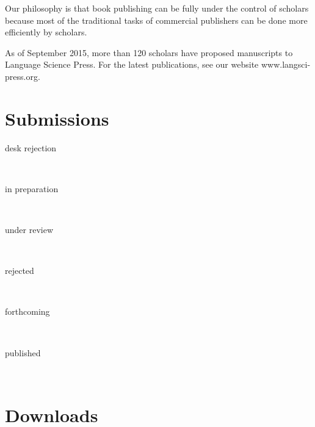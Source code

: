 \documentclass[
notumble,
nofoldmark,
]{leaflet}
\begin{document}
 Our philosophy is that book publishing can be fully under the control of scholars because most of the traditional tasks of commercial publishers can be done more efficiently by scholars. 
 
As of September 2015, more than 120 scholars have proposed manuscripts to Language Science Press. For the latest publications, see our website www.langsci-press.org. 
   
\newpage 
\newlength{\submissionfactor}
\setlength{\submissionfactor}{.9mm}
\newcommand{\submission}[3]{
\parbox[m][.1cm][c]{2.5cm}{\color{LIGHTGRAY} #1}\colorbox{#2}{\parbox[m][.3cm][c]{#3\submissionfactor}{\bfseries\sffamily #3}}\\ 
}

\section{\sffamily\Large\bfseries Submissions}
\submission{desk rejection}{lsRed}{19}
\submission{in preparation}{lsLightBlue}{66}
\submission{under review}{lsDarkBlue}{2}
\submission{rejected}{lsLightOrange}{6}
\submission{forthcoming}{lsSoftGreen}{15}
\submission{published}{lsRichGreen}{14}



 


\section{\sffamily\Large\bfseries Downloads}
\vspace*{-1em}
\parbox[b][0cm][b]{0cm}{
}
\end{document}
